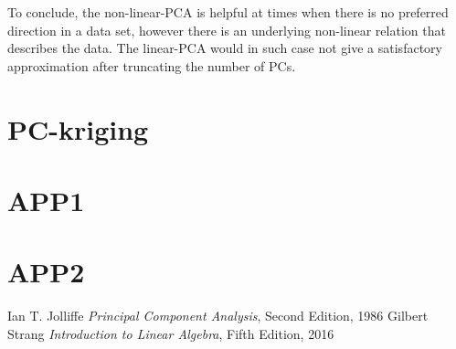 \documentclass[20pt,twocolumn]{article}
\begin{document}
To conclude, the non-linear-PCA is helpful at times when there is no preferred direction in a data set, however there is an underlying non-linear relation that describes the data. The linear-PCA would in such case not give a satisfactory approximation after truncating the number of PCs. 


\section{PC-kriging}



\appendix

\section{APP1} \label{app:A}

\section{APP2} \label{app:B}

\thebibliography{}

 Ian T. Jolliffe \textit{Principal Component Analysis}, Second Edition, 1986
 Gilbert Strang \textit{Introduction to Linear Algebra}, Fifth Edition, 2016

 \label{bib:pope}
\end{document}
